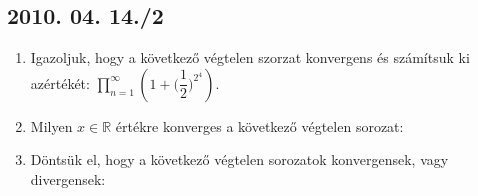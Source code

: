 \subsection*{2010. 04. 14./2}
\begin{enumerate}
\item Igazoljuk, hogy a következő végtelen szorzat konvergens és számítsuk ki azértékét: $\displaystyle\prod_{n=1}^{\infty} \left(1+\Big( \dfrac{1}{2}\Big) ^{2^4}\right)$.
\item Milyen $x\in\mathbb{R}$ értékre konverges a következő végtelen sorozat:
\item Döntsük el, hogy a következő végtelen sorozatok konvergensek, vagy divergensek:

\end{enumerate}

